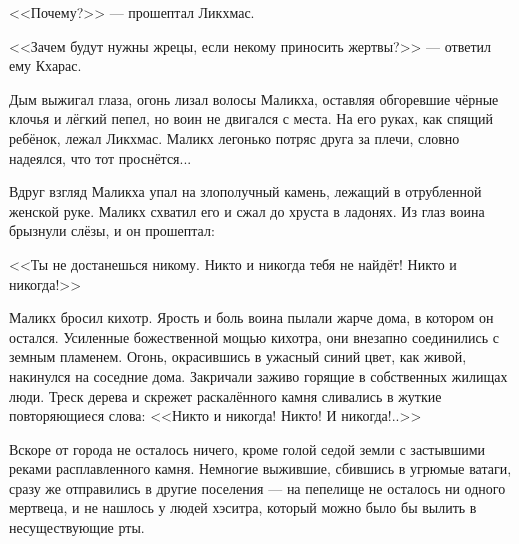 \textspace

<<Почему?>> --- прошептал Ликхмас.

<<Зачем будут нужны жрецы, если некому приносить жертвы?>> --- ответил ему Кхарас.

\textspace

Дым выжигал глаза, огонь лизал волосы Маликха, оставляя обгоревшие чёрные клочья и лёгкий пепел, но воин не двигался с места.
На его руках, как спящий ребёнок, лежал Ликхмас.
Маликх легонько потряс друга за плечи, словно надеялся, что тот проснётся...

Вдруг взгляд Маликха упал на злополучный камень, лежащий в отрубленной женской руке.
Маликх схватил его и сжал до хруста в ладонях.
Из глаз воина брызнули слёзы, и он прошептал:

<<Ты не достанешься никому.
Никто и никогда тебя не найдёт!
Никто и никогда!>>

Маликх бросил кихотр.
Ярость и боль воина пылали жарче дома, в котором он остался.
Усиленные божественной мощью кихотра, они внезапно соединились с земным пламенем.
Огонь, окрасившись в ужасный синий цвет, как живой, накинулся на соседние дома.
Закричали заживо горящие в собственных жилищах люди.
Треск дерева и скрежет раскалённого камня сливались в жуткие повторяющиеся слова: <<Никто и никогда!
Никто!
И никогда!..>>

Вскоре от города не осталось ничего, кроме голой седой земли с застывшими реками расплавленного камня.
Немногие выжившие, сбившись в угрюмые ватаги, сразу же отправились в другие поселения --- на пепелище не осталось ни одного мертвеца, и не нашлось у людей хэситра, который можно было бы вылить в несуществующие рты.


